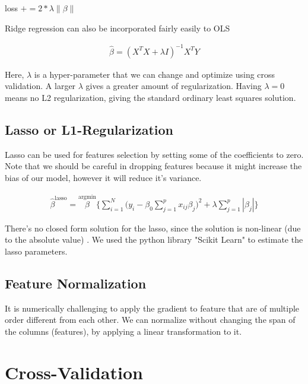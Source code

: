 \documentclass[conference]{IEEEtran}\usepackage[]{graphicx}\usepackage[]{color}
\begin{document}
\begin{algorithmic}
  \State loss $+= 2 * \lambda \| \beta \|$
  \EndIf
\end{algorithmic}


Ridge regression can also be incorporated fairly easily to OLS 

\begin{eqnarray*}
 \hat{\beta} = (X^TX + \lambda I)^{-1}X^TY
\end{eqnarray*}

Here, $\lambda$ is a hyper-parameter that we can change and optimize using cross validation. A larger $\lambda$ gives a greater amount of regularization. Having $\lambda = 0$ means no L2 regularization, giving the standard ordinary least squares solution.

\subsection{Lasso or L1-Regularization}

Lasso can be used for features selection by setting some of the coefficients to
zero. Note that we should be careful in dropping features because it might
increase the bias of our model, however it will reduce it's variance.

\begin{eqnarray*}
  \hat{\beta}^{\text{lasso}} = \stackrel{\text{argmin}}{\beta}
  \Bigg\{ \sum_{i=1}^N \bigg(y_i - \beta_0 \sum_{j=1}^p x_{ij} \beta_j \bigg)^2 +
  \lambda \sum_{j=1}^p | \beta_j | \Bigg\}
\end{eqnarray*}

There's no closed form solution for the lasso, since the solution is non-linear
(due to the absolute value) \cite{hastie2005elements}. We used the python
library "Scikit Learn" \cite{scikit-learn} to estimate the lasso parameters.

\subsection{Feature Normalization}

It is numerically challenging to apply the gradient to feature that are of
multiple order different from each other. We can normalize without changing
the span of the columns (features), by applying a linear transformation to it.

\section{Cross-Validation}
\end{document}
